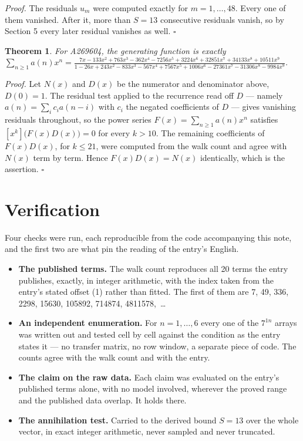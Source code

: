 \documentclass[11pt]{article}
\newtheorem{theorem}{Theorem}
\theoremstyle{definition}
\begin{document}
{\itshape Proof.} The residuals $u_m$ were computed exactly for $m = 1,\dots,48$. Every one of them vanished. After it, more than $S = 13$ consecutive residuals vanish, so by Section 5 every later residual vanishes as well. $\square$

\begin{theorem} For A269604, the generating function is exactly $\sum_{n\ge 1} a(n)x^n = \frac{7x - 133x^{2} + 763x^{3} - 362x^{4} - 7256x^{5} + 3224x^{6} + 32851x^{7} + 34133x^{8} + 10511x^{9}}{1 - 26x + 243x^{2} - 833x^{3} - 567x^{4} + 7567x^{5} + 1006x^{6} - 27361x^{7} - 31306x^{8} - 9984x^{9}}$.\end{theorem}

{\itshape Proof.} Let $N(x)$ and $D(x)$ be the numerator and denominator above, $D(0)=1$. The residual test applied to the recurrence read off $D$ --- namely $a(n) = \sum_i c_i a(n-i)$ with $c_i$ the negated coefficients of $D$ --- gives vanishing residuals throughout, so the power series $F(x)=\sum_{n\ge 1}a(n)x^n$ satisfies $[x^k]\bigl(F(x)D(x)\bigr) = 0$ for every $k > 10$. The remaining coefficients of $F(x)D(x)$, for $k \le 21$, were computed from the walk count and agree with $N(x)$ term by term. Hence $F(x)D(x) = N(x)$ identically, which is the assertion. $\square$

\section{Verification}

Four checks were run, each reproducible from the code accompanying this note, and the first two are what pin the reading of the entry's English.

\begin{itemize}

\item {\bfseries The published terms.} The walk count reproduces all 20 terms the entry publishes, exactly, in integer arithmetic, with the index taken from the entry's stated offset (1) rather than fitted. The first of them are 7, 49, 336, 2298, 15630, 105892, 714874, 4811578,~\dots

\item {\bfseries An independent enumeration.} For $n = 1,\dots,6$ every one of the $7^{1n}$ arrays was written out and tested cell by cell against the condition as the entry states it --- no transfer matrix, no row window, a separate piece of code. The counts agree with the walk count and with the entry.

\item {\bfseries The claim on the raw data.} Each claim was evaluated on the entry's published terms alone, with no model involved, wherever the proved range and the published data overlap. It holds there.

\item {\bfseries The annihilation test.} Carried to the derived bound $S = 13$ over the whole vector, in exact integer arithmetic, never sampled and never truncated.

\end{itemize}
\end{document}
